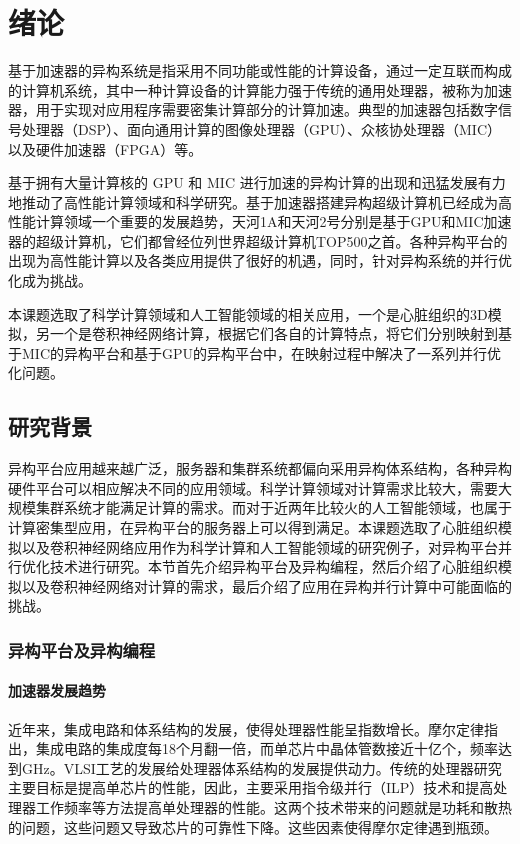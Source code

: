 \chapter{绪论}
基于加速器的异构系统是指采用不同功能或性能的计算设备，通过一定互联而构成的计算机系统，其中一种计算设备的计算能力强于传统的通用处理器，被称为加速器，用于实现对应用程序需要密集计算部分的计算加速。典型的加速器包括数字信号处理器（DSP）、面向通用计算的图像处理器（GPU）、众核协处理器（MIC）以及硬件加速器（FPGA）等。

基于拥有大量计算核的 GPU 和 MIC 进行加速的异构计算的出现和迅猛发展有力地推动了高性能计算领域和科学研究。基于加速器搭建异构超级计算机已经成为高性能计算领域一个重要的发展趋势，天河1A和天河2号分别是基于GPU和MIC加速器的超级计算机，它们都曾经位列世界超级计算机TOP500之首。各种异构平台的出现为高性能计算以及各类应用提供了很好的机遇，同时，针对异构系统的并行优化成为挑战。

本课题选取了科学计算领域和人工智能领域的相关应用，一个是心脏组织的3D模拟，另一个是卷积神经网络计算，根据它们各自的计算特点，将它们分别映射到基于MIC的异构平台和基于GPU的异构平台中，在映射过程中解决了一系列并行优化问题。
\section{研究背景}
异构平台应用越来越广泛，服务器和集群系统都偏向采用异构体系结构，各种异构硬件平台可以相应解决不同的应用领域。科学计算领域对计算需求比较大，需要大规模集群系统才能满足计算的需求。而对于近两年比较火的人工智能领域，也属于计算密集型应用，在异构平台的服务器上可以得到满足。本课题选取了心脏组织模拟以及卷积神经网络应用作为科学计算和人工智能领域的研究例子，对异构平台并行优化技术进行研究。本节首先介绍异构平台及异构编程，然后介绍了心脏组织模拟以及卷积神经网络对计算的需求，最后介绍了应用在异构并行计算中可能面临的挑战。

\subsection{异构平台及异构编程}
       \subsubsection{加速器发展趋势}
       近年来，集成电路和体系结构的发展，使得处理器性能呈指数增长。摩尔定律指出，集成电路的集成度每18个月翻一倍，而单芯片中晶体管数接近十亿个，频率达到GHz。VLSI工艺的发展给处理器体系结构的发展提供动力。传统的处理器研究主要目标是提高单芯片的性能，因此，主要采用指令级并行（ILP）技术和提高处理器工作频率等方法提高单处理器的性能。这两个技术带来的问题就是功耗和散热的问题，这些问题又导致芯片的可靠性下降。这些因素使得摩尔定律遇到瓶颈。
       
